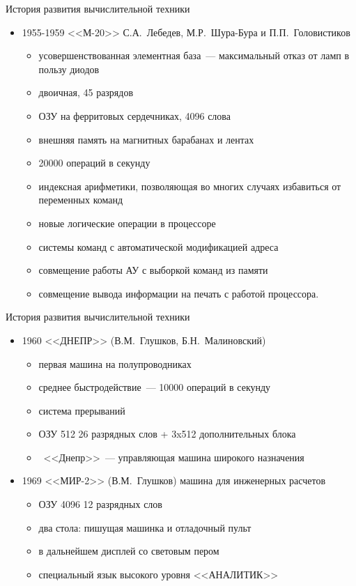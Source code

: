 \documentclass[aspectratio=169,14pt]{beamer}
\begin{document}
\begin{frame}{История развития вычислительной техники}
    \begin{itemize}
        \item 1955-1959 <<М-20>> С.А.~Лебедев, М.Р.~Шура-Бура и П.П.~Головистиков
        \begin{itemize}
            \item усовершенствованная элементная база~--- максимальный отказ от ламп
            в пользу диодов
            \item двоичная, 45 разрядов
            \item ОЗУ на ферритовых сердечниках, 4096 слова
            \item внешняя память на магнитных барабанах и лентах
            \item 20000 операций в секунду
            \item индексная арифметики, позволяющая во многих случаях избавиться от
            переменных команд
            \item новые логические операции в процессоре
            \item системы команд с автоматической модификацией адреса
            \item совмещение работы АУ с выборкой команд из памяти
            \item совмещение вывода информации на печать с работой процессора.
        \end{itemize}
    \end{itemize}
\end{frame}

\begin{frame}{История развития вычислительной техники}
    \begin{itemize}
        \item 1960 <<ДНЕПР>> (В.М.~Глушков, Б.Н.~Малиновский)
        \begin{itemize}
            \item первая машина на полупроводниках
            \item среднее быстродействие~--- 10000 операций в секунду
            \item система прерываний
            \item ОЗУ 512 26 разрядных слов + 3x512 дополнительных блока
            \item ~<<Днепр>>~--- управляющая машина широкого назначения
        \end{itemize}
        \item 1969 <<МИР-2>> (В.М.~Глушков) машина для инженерных расчетов
        \begin{itemize}
            \item ОЗУ 4096 12 разрядных слов
            \item два стола: пишущая машинка и отладочный пульт
            \item в дальнейшем дисплей со световым пером
            \item специальный язык высокого уровня <<АНАЛИТИК>>
        \end{itemize}
    \end{itemize}
\end{frame}
\end{document}
